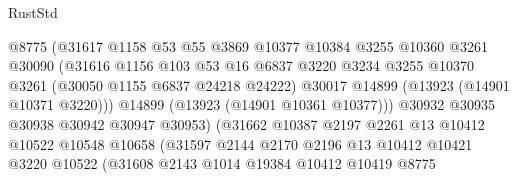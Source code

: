 \begin{lexlean}{RustStd}
\begin{coremodule}
                                  @8775
                                  (@31617
                                    @1158
                                    @53
                                    @55
                                    @3869
                                    @10377
                                    @10384
                                    @3255
                                    @10360
                                    @3261
                                    @30090
                                    (@31616
                                      @1156
                                      @103
                                      @53
                                      @16
                                      @6837
                                      @3220
                                      @3234
                                      @3255
                                      @10370
                                      @3261
                                      (@30050 @1155 @6837 @24218 @24222)
                                      @30017
                                      @14899
                                      (@13923 (@14901 @10371 @3220)))
                                    @14899
                                    (@13923 (@14901 @10361 @10377)))
                                  @30932
                                  @30935
                                  @30938
                                  @30942
                                  @30947
                                  @30953)
                                (@31662
                                  @10387
                                  @2197
                                  @2261
                                  @13
                                  @10412
                                  @10522
                                  @10548
                                  @10658
                                  (@31597
                                    @2144
                                    @2170
                                    @2196
                                    @13
                                    @10412
                                    @10421
                                    @3220
                                    @10522
                                    (@31608
                                      @2143
                                      @1014
                                      @19384
                                      @10412
                                      @10419
                                      @8775

\end{coremodule}
\end{lexlean}
